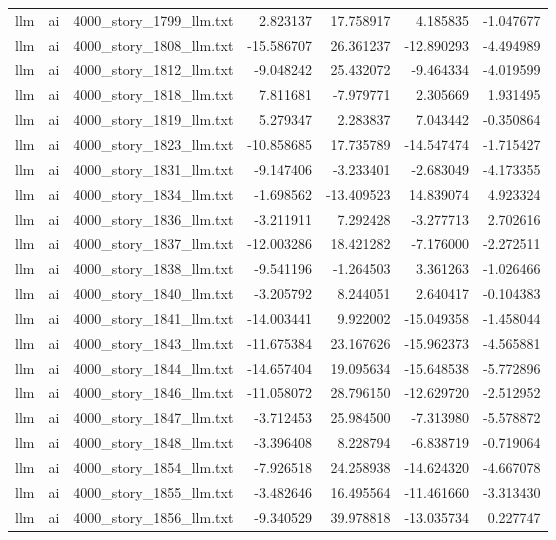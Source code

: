 \begin{longtable}{lllrrrr}
llm & ai & 4000\_story\_1799\_llm.txt & 2.823137 & 17.758917 & 4.185835 & -1.047677 \\
llm & ai & 4000\_story\_1808\_llm.txt & -15.586707 & 26.361237 & -12.890293 & -4.494989 \\
llm & ai & 4000\_story\_1812\_llm.txt & -9.048242 & 25.432072 & -9.464334 & -4.019599 \\
llm & ai & 4000\_story\_1818\_llm.txt & 7.811681 & -7.979771 & 2.305669 & 1.931495 \\
llm & ai & 4000\_story\_1819\_llm.txt & 5.279347 & 2.283837 & 7.043442 & -0.350864 \\
llm & ai & 4000\_story\_1823\_llm.txt & -10.858685 & 17.735789 & -14.547474 & -1.715427 \\
llm & ai & 4000\_story\_1831\_llm.txt & -9.147406 & -3.233401 & -2.683049 & -4.173355 \\
llm & ai & 4000\_story\_1834\_llm.txt & -1.698562 & -13.409523 & 14.839074 & 4.923324 \\
llm & ai & 4000\_story\_1836\_llm.txt & -3.211911 & 7.292428 & -3.277713 & 2.702616 \\
llm & ai & 4000\_story\_1837\_llm.txt & -12.003286 & 18.421282 & -7.176000 & -2.272511 \\
llm & ai & 4000\_story\_1838\_llm.txt & -9.541196 & -1.264503 & 3.361263 & -1.026466 \\
llm & ai & 4000\_story\_1840\_llm.txt & -3.205792 & 8.244051 & 2.640417 & -0.104383 \\
llm & ai & 4000\_story\_1841\_llm.txt & -14.003441 & 9.922002 & -15.049358 & -1.458044 \\
llm & ai & 4000\_story\_1843\_llm.txt & -11.675384 & 23.167626 & -15.962373 & -4.565881 \\
llm & ai & 4000\_story\_1844\_llm.txt & -14.657404 & 19.095634 & -15.648538 & -5.772896 \\
llm & ai & 4000\_story\_1846\_llm.txt & -11.058072 & 28.796150 & -12.629720 & -2.512952 \\
llm & ai & 4000\_story\_1847\_llm.txt & -3.712453 & 25.984500 & -7.313980 & -5.578872 \\
llm & ai & 4000\_story\_1848\_llm.txt & -3.396408 & 8.228794 & -6.838719 & -0.719064 \\
llm & ai & 4000\_story\_1854\_llm.txt & -7.926518 & 24.258938 & -14.624320 & -4.667078 \\
llm & ai & 4000\_story\_1855\_llm.txt & -3.482646 & 16.495564 & -11.461660 & -3.313430 \\
llm & ai & 4000\_story\_1856\_llm.txt & -9.340529 & 39.978818 & -13.035734 & 0.227747 \\

\end{longtable}
